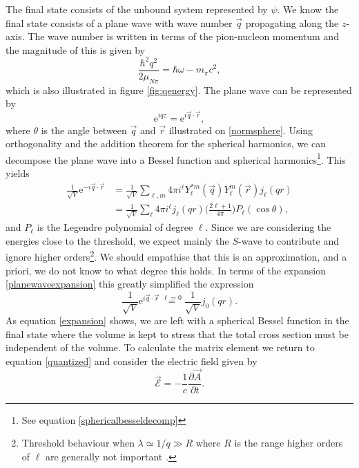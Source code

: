 The final state consists of the unbound system represented by $\psi$. We know the final state consists of a plane wave with wave number $\vec{q}$ propagating along the $z$-axis. The wave number  is written in terms of the pion-nucleon momentum and the magnitude of this is given by
\begin{equation}\label{key}
	\frac{\hbar^2 q^2}{2\mu_{N\pi}}=\hbar \omega-m_\pi c^2,
\end{equation}
which is also illustrated in figure \ref{fig:qenergy}. The plane wave can be represented by 
\begin{equation} \label{key}
	\text{e}^{iqz} = \text{e}^{i \vec{q}\cdot \vec{r}},
\end{equation}
where $\theta$ is the angle between $\vec{q}$ and $\vec{r}$ illustrated on \ref{normsphere}. Using orthogonality and the addition theorem for the spherical harmonics, we can decompose the plane wave into a Bessel function and spherical harmonics\footnote{See equation \eqref{sphericalbesseldecomp}}. This yields
\begin{align}\label{planewaveexpansion}
	\frac{1}{\sqrt{V}} \text{e}^{-i\vec{q}\cdot\vec{r}} &= \frac{1}{\sqrt{V}} \sum_{\ell,m} 4\pi i^\ell Y_\ell^{*m}(\vec{q})Y_\ell^m(\vec{r})j_\ell(qr) \\
	&= \frac{1}{\sqrt{V}} \sum_\ell 4\pi i^\ell j_\ell(qr) \bigg( \frac{2\ell+1}{4\pi}\bigg)P_\ell(\cos\theta),
\end{align}
and $P_\ell$ is the Legendre polynomial of degree $\ell$. Since we are considering the energies close to the threshold, we expect mainly the $S$-wave to contribute and ignore higher orders\footnote{Threshold behaviour when $\lambda\simeq1/q\gg R$ where $R$ is the range higher orders of $\ell$ are generally not important \cite{Sakurai}.}. We should empathise that this is an approximation, and a priori, we do not know to what degree this holds. In terms of the expansion \eqref{planewaveexpansion} this greatly simplified the expression
\begin{equation} \label{expansion}
	\frac{1}{\sqrt{V}}\text{e}^{i\vec{q}\cdot \vec{r}} \stackrel{\ell=0}{=} \frac{1}{\sqrt{V}}j_0(qr).
\end{equation}
As equation \eqref{expansion} shows, we are left with a spherical Bessel function in the final state where the volume is kept to stress that the total cross section must be independent of the volume. To calculate the matrix element we return to equation \eqref{quantized} and consider the electric field given by
\begin{equation}\label{EF}
	\vec{\mathcal{E}} = -\frac{1}{c} \frac{\partial \vec{A}}{\partial t}.
\end{equation}
